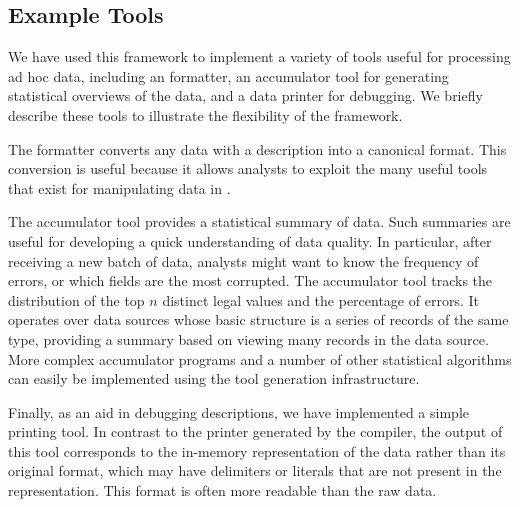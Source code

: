 \subsection{Example Tools}
\label{sec:gentool-motivation-ex}

We have used this framework to implement a variety of tools useful for processing ad hoc data, including an \xml{} formatter, an accumulator tool for generating statistical overviews of the data, and a data printer for debugging.  We briefly describe these tools to illustrate the flexibility of the framework.

The \xml{} formatter converts any data with a \padsml{} description
into a canonical \xml{} format.  This conversion is useful because it
allows analysts to exploit the many useful tools that exist for
manipulating data in \xml{}. 

The accumulator tool provides a statistical summary of data.
Such summaries are useful for developing a quick understanding of data quality.  In particular, after receiving a new batch of data, analysts might want to know the frequency of errors, or which fields are the most corrupted. 
The accumulator tool tracks the distribution of the top $n$
distinct legal values and the percentage of errors. 
It operates over data sources
whose basic structure is a series of records of the same type, 
providing a summary based on viewing many records
in the data source.    More complex accumulator programs and a number of other statistical algorithms can easily be implemented using the tool generation infrastructure.

Finally, as an aid in debugging \padsml{} descriptions, we have implemented a simple printing tool.  In contrast to the printer generated by the \padsml{} compiler, the output of this tool corresponds to the in-memory
representation of the data rather than its original format, which may have delimiters or literals that are not present in the representation.  
This format is often more readable than the raw data.

